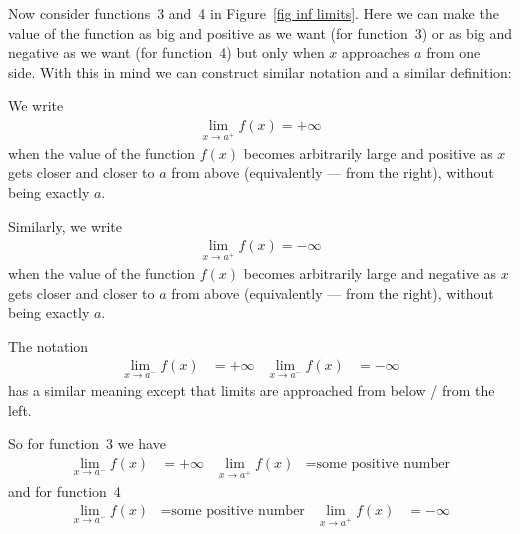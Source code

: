 Now consider functions~3 and~4 in Figure~\ref{fig inf limits}. Here we can make
the value of the function as big and positive as we want (for function~3) or as
big and negative as we want (for function~4) but only when $x$ approaches $a$
from one side. With this in mind we can construct similar notation and a
similar definition:
\begin{defn}
\label{def onesidedlim is inf informal}
  We write
 \begin{align*}
  \lim_{x \to a^+} f(x) = + \infty
 \end{align*}
  when the value of the function $f(x)$ becomes arbitrarily large and
  positive as $x$ gets closer and closer to $a$ from above (equivalently ---
from the right), without being exactly $a$.

  Similarly, we write
 \begin{align*}
  \lim_{x \to a^+} f(x) = - \infty
 \end{align*}
  when the value of the function $f(x)$ becomes arbitrarily large and
  negative as $x$ gets closer and closer to $a$ from above (equivalently ---
from the right), without being exactly $a$.

  The notation
\begin{align*}
  \lim_{x \to a^-} f(x) &= + \infty
&
  \lim_{x \to a^-} f(x) &= - \infty
\end{align*}
  has a  similar meaning except that limits are approached from below / from
the left.
\end{defn}
So for function~3 we have
\begin{align*}
  \lim_{x\to a^-} f(x) &= +\infty
&
  \lim_{x\to a^+} f(x) &= \text{some positive number}
\end{align*}
and for function~4
\begin{align*}
  \lim_{x\to a^-} f(x) &= \text{some positive number}
&
  \lim_{x\to a^+} f(x) &= -\infty
\end{align*}

